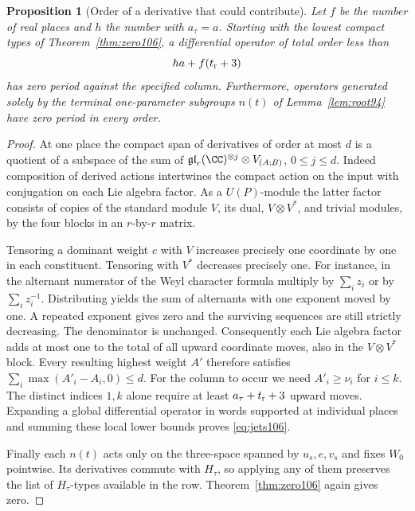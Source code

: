 \documentclass[a4paper,11pt]{article}
\newtheorem{proposition}{Proposition}[section]
\theoremstyle{definition}
\theoremstyle{remark}
\numberwithin{equation}{section}
\begin{document}
\begin{proposition}[Order of a derivative that could contribute]\label{prop:jets106}
Let \(f\) be the number of real places and \(h\) the number with
\(a_\tau=a\). Starting with the lowest compact types of
Theorem~\ref{thm:zero106}, a differential operator of total order
less than
\begin{equation}
                    ha+f(t_{\rm r}+3)                 \label{eq:jets106}
\end{equation}
has zero period against the specified column. Furthermore, operators
generated solely by the terminal one-parameter subgroups \(n(t)\)
of Lemma~\ref{lem:root94} have zero period in every order.
\end{proposition}
\begin{proof}
At one place the compact span of derivatives of order at most \(d\)
is a quotient of a subspace of the sum of
\(\mathfrak{gl}_r(\CC)^{\otimes j}\otimes V_{(A;B)}\), \(0\le j\le d\).
Indeed composition of derived actions intertwines the compact
action on the input with conjugation on each Lie algebra factor.
As a \(U(P)\)-module the latter factor consists of copies of the
standard module \(V\), its dual, \(V\otimes V^*\), and trivial
modules, by the four blocks in an \(r\)-by-\(r\) matrix.

Tensoring a dominant weight \(c\) with \(V\) increases precisely
one coordinate by one in each constituent. Tensoring with \(V^*\)
decreases precisely one. For instance, in the alternant numerator
of the Weyl character formula multiply by \(\sum_i z_i\) or by
\(\sum_i z_i^{-1}\). Distributing yields the sum of alternants with
one exponent moved by one. A repeated exponent gives zero and the
surviving sequences are still strictly decreasing. The denominator
is unchanged. Consequently each Lie algebra factor adds at most
one to the total of all upward coordinate moves, also in the
\(V\otimes V^*\) block. Every resulting highest weight \(A'\)
therefore satisfies \(\sum_i\max(A'_i-A_i,0)\le d\).
For the column to occur we need \(A'_i\ge\nu_i\) for \(i\le k\).
The distinct indices \(1,k\) alone require at least
\(a_\tau+t_{\rm r}+3\) upward moves. Expanding a global differential
operator in words supported at individual places and summing these
local lower bounds proves \eqref{eq:jets106}.

Finally each \(n(t)\) acts only on the three-space spanned by
\(u_s,e,v_s\) and fixes \(W_0\) pointwise. Its derivatives commute
with \(H_\tau\), so applying any of them preserves the list of
\(H_\tau\)-types available in the row. Theorem~\ref{thm:zero106}
again gives zero.
\end{proof}
\end{document}
